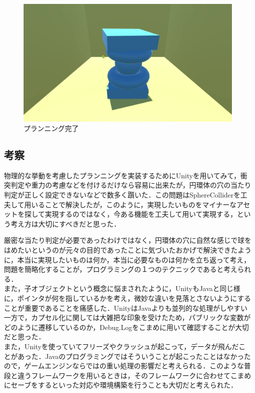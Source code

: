 \documentclass[12pt]{jarticle}
\begin{document}
\begin{figure}[!hbt]
  	\begin{center}
  		\includegraphics[scale=0.2]{images/bwp7.jpg}
	\end{center}
  	\caption{プランニング完了}
\end{figure}
\clearpage

\subsection{考察}
物理的な挙動を考慮したプランニングを実装するためにUnityを用いてみて，衝突判定や重力の考慮などを付けるだけなら容易に出来たが，円環体の穴の当たり判定が正しく設定できないなどで数多く躓いた．この問題はSphereColliderを工夫して用いることで解決したが，このように，実現したいものをマイナーなアセットを探して実現するのではなく，今ある機能を工夫して用いて実現する，という考え方は大切にすべきだと思った．

厳密な当たり判定が必要であったわけではなく，円環体の穴に自然な感じで球をはめたいというのが元々の目的であったことに気づいたおかげで解決できたように，本当に実現したいものは何か，本当に必要なものは何かを立ち返って考え，問題を簡略化することが，プログラミングの１つのテクニックであると考えられる． \\

また，子オブジェクトという概念に悩まされたように，UnityもJavaと同じ様に，ポインタが何を指しているかを考え，微妙な違いを見落とさないようにすることが重要であることを痛感した．UnityはJavaよりも並列的な処理がしやすい一方で，カプセル化に関しては大雑把な印象を受けたため，パブリックな変数がどのように遷移しているのか，Debug.Logをこまめに用いて確認することが大切だと思った． \\

また，Unityを使っていてフリーズやクラッシュが起こって，データが飛んだことがあった．Javaのプログラミングではそういうことが起こったことはなかったので，ゲームエンジンならではの重い処理の影響だと考えられる．このような普段と違うフレームワークを用いるときは，そのフレームワークに合わせてこまめにセーブをするといった対応や環境構築を行うことも大切だと考えられた． \\
\end{document}
